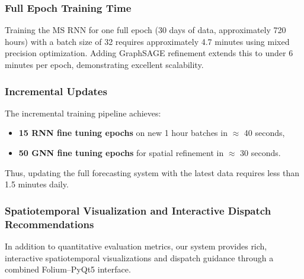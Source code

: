 \documentclass{article}
\begin{document}
\subsubsection{Full Epoch Training Time}

Training the MS RNN for one full epoch (30 days of data, approximately 720 hours) with a batch size of 32 requires approximately 4.7 minutes using mixed precision optimization.  
Adding GraphSAGE refinement extends this to under 6 minutes per epoch, demonstrating excellent scalability.

\subsubsection{Incremental Updates}

The incremental training pipeline achieves:
\begin{itemize}
  \item \textbf{15 RNN fine tuning epochs} on new 1 hour batches in \(\approx\) 40 seconds,
  \item \textbf{50 GNN fine tuning epochs} for spatial refinement in \(\approx\) 30 seconds.
\end{itemize}
Thus, updating the full forecasting system with the latest data requires less than 1.5 minutes daily.


\subsubsection{Spatiotemporal Visualization and Interactive Dispatch Recommendations}

In addition to quantitative evaluation metrics, our system provides rich, interactive spatiotemporal visualizations and dispatch guidance through a combined Folium–PyQt5 interface.
\end{document}
